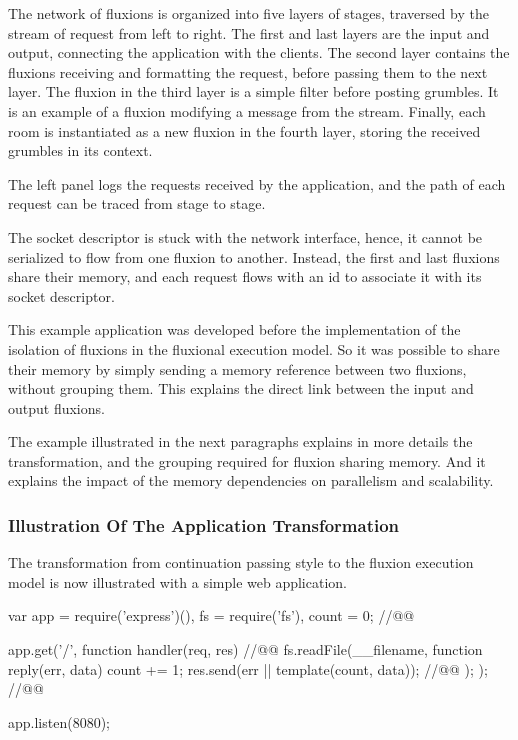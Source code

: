 The network of fluxions is organized into five layers of stages, traversed by the stream of request from left to right.
The first and last layers are the input and output, connecting the application with the clients.
The second layer contains the fluxions receiving and formatting the request, before passing them to the next layer.
The fluxion in the third layer is a simple filter before posting grumbles.
It is an example of a fluxion modifying a message from the stream.
Finally, each room is instantiated as a new fluxion in the fourth layer, storing the received grumbles in its context.

The left panel logs the requests received by the application, and the path of each request can be traced from stage to stage.

The socket descriptor is stuck with the network interface, hence, it cannot be serialized to flow from one fluxion to another.
Instead, the first and last fluxions share their memory, and each request flows with an id to associate it with its socket descriptor.

This example application was developed before the implementation of the isolation of fluxions in the fluxional execution model.
So it was possible to share their memory by simply sending a memory reference between two fluxions, without grouping them.
This explains the direct link between the input and output fluxions.

The example illustrated in the next paragraphs explains in more details the transformation, and the grouping required for fluxion sharing memory.
And it explains the impact of the memory dependencies on parallelism and scalability.

\subsubsection{Illustration Of The Application Transformation}

The transformation from continuation passing style to the fluxion execution model is now illustrated with a simple web application.

\begin{code}[js,
  caption={Example web application},
  label={lst:source}]
var app = require('express')(),
    fs = require('fs'),
    count = 0; //@\label{lst:source-counter}@

app.get('/', function handler(req, res){ //@\label{lst:source-handler}@
  fs.readFile(__filename, function reply(err, data) {
    count += 1;
    res.send(err || template(count, data)); //@\label{lst:source-send}@
  });
}); //@\label{lst:source-handler-end}@

app.listen(8080);
\end{code}

